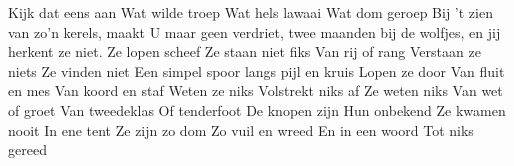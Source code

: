 \beginverse*
Kijk dat eens aan 
Wat wilde troep 
Wat hels lawaai 
Wat dom geroep
\endverse
\beginchorus
Bij 't zien van zo’n kerels,
maakt U maar geen verdriet,
twee maanden bij de wolfjes,
en jij herkent ze niet.
\endchorus
\beginverse*
Ze lopen scheef 
Ze staan niet fiks 
Van rij of rang 
Verstaan ze niets 
\endverse
\beginverse*
Ze vinden niet 
Een simpel spoor 
langs pijl en kruis 
Lopen ze door 
\endverse
\beginverse*
Van fluit en mes 
Van koord en staf 
Weten ze niks 
Volstrekt niks af 
\endverse
\beginverse*
Ze weten niks 
Van wet of groet 
Van tweedeklas 
Of tenderfoot 
\endverse
\beginverse*
De knopen zijn 
Hun onbekend 
Ze kwamen nooit 
In ene tent 
\endverse
\beginverse*
Ze zijn zo dom 
Zo vuil en wreed 
En in een woord 
Tot niks gereed 
\endverse
\endsong